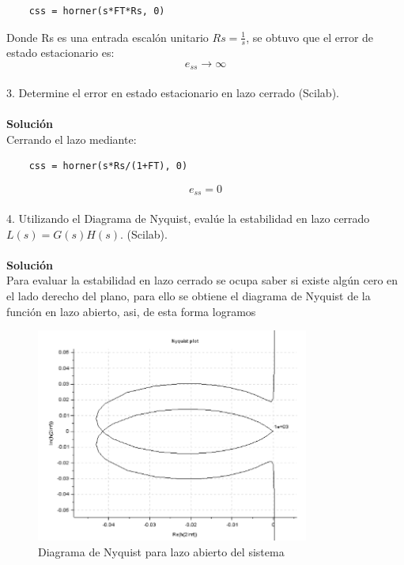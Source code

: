 \documentclass[12pt,letterpaper]{article}
\begin{document}
\begin{verbatim}
    css = horner(s*FT*Rs, 0)
\end{verbatim}

Donde Rs es una entrada escalón unitario $Rs = \frac{1}{s}$, se obtuvo que el error de estado estacionario es:
\begin{equation}
    e_{ss} \to \infty
\end{equation}
\\

3. Determine el error en estado estacionario en lazo cerrado (Scilab).\\
\\
\textbf{Solución}\\

Cerrando el lazo mediante:

\begin{verbatim}
    css = horner(s*Rs/(1+FT), 0)
\end{verbatim}

\begin{equation}
    e_{ss} = 0
\end{equation}
\\

4. Utilizando el Diagrama de Nyquist, evalúe la estabilidad en lazo cerrado $L(s) = G(s)H(s)$. (Scilab).\\
\\
\textbf{Solución}\\
Para evaluar la estabilidad en lazo cerrado se ocupa saber si existe algún cero en el lado derecho del plano, para ello se obtiene el diagrama de Nyquist de la función en lazo abierto, asi, de esta forma logramos 

\begin{figure}
  \centering
    \includegraphics[width=0.8\textwidth]{4nyquist_FT.png}
  \caption{Diagrama de Nyquist para lazo abierto del sistema}
  \label{Nyq}
\end{figure}
\end{document}
